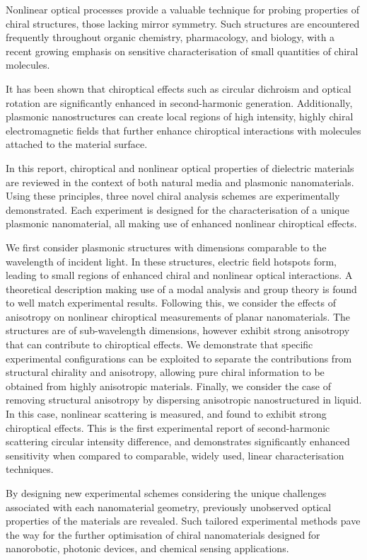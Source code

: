Nonlinear optical processes provide a valuable technique for probing properties of chiral structures, those lacking mirror symmetry. 
Such structures are encountered frequently throughout organic chemistry, pharmacology, and biology, with a recent growing emphasis on sensitive characterisation of small quantities of chiral molecules. 
	    
It has been shown that chiroptical effects such as circular dichroism and optical rotation are significantly enhanced in second-harmonic generation. 
Additionally, plasmonic nanostructures can create local regions of high intensity, highly chiral electromagnetic fields that further enhance chiroptical interactions with molecules attached to the material surface. 
	    
In this report, chiroptical and nonlinear optical properties of dielectric materials are reviewed in the context of both natural media and plasmonic nanomaterials. 
Using these principles, three novel chiral analysis schemes are experimentally demonstrated. Each experiment is designed for the characterisation of a unique plasmonic nanomaterial, all making use of enhanced nonlinear chiroptical effects. 

We first consider plasmonic structures with dimensions comparable to the wavelength of incident light. In these structures, electric field hotspots form, leading to small regions of enhanced chiral and nonlinear optical interactions. A theoretical description making use of a modal analysis and group theory is found to well match experimental results. Following this, we consider the effects of anisotropy on nonlinear chiroptical measurements of planar nanomaterials. The structures are of sub-wavelength dimensions, however exhibit strong anisotropy that can contribute to chiroptical effects. We demonstrate that specific experimental configurations can be exploited to separate the contributions from structural chirality and anisotropy, allowing pure chiral information to be obtained from highly anisotropic materials. Finally, we consider the case of removing structural anisotropy by dispersing anisotropic nanostructured in liquid. In this case, nonlinear scattering is measured, and found to exhibit strong chiroptical effects. This is the first experimental report of second-harmonic scattering circular intensity difference, and demonstrates significantly enhanced sensitivity when compared to comparable, widely used, linear characterisation techniques.

By designing new experimental schemes considering the unique challenges associated with each nanomaterial geometry, previously unobserved optical properties of the materials are revealed. Such tailored experimental methods pave the way for the further optimisation of chiral nanomaterials designed for nanorobotic, photonic devices, and chemical sensing applications.
